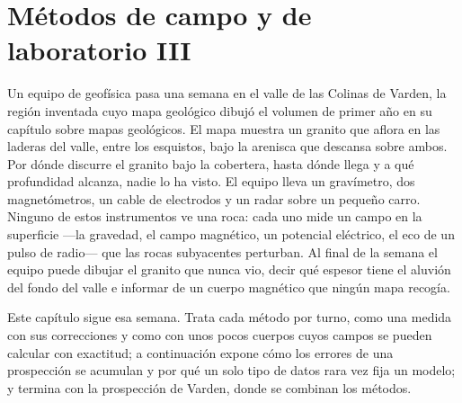 \chapter{Métodos de campo y de laboratorio III}\label{ch:b3:field-lab-methods-3}

Un equipo de geofísica pasa una semana en el valle de las Colinas de Varden, la
región inventada cuyo mapa geológico dibujó el volumen de primer año en su
capítulo sobre mapas geológicos. El mapa muestra un granito que aflora en
las laderas del valle, entre los esquistos, bajo la arenisca que descansa
sobre ambos. Por dónde discurre el granito bajo la cobertera, hasta dónde llega
y a qué profundidad alcanza, nadie lo ha visto. El equipo lleva un gravímetro,
dos magnetómetros, un cable de electrodos y un radar sobre un pequeño carro.
Ninguno de estos instrumentos ve una roca: cada uno mide un campo en la
superficie —la gravedad, el campo magnético, un potencial eléctrico, el eco de un pulso de radio—
que las rocas subyacentes perturban.
Al final de la semana el equipo puede dibujar el granito que nunca vio, decir
qué espesor tiene el aluvión del fondo del valle e informar de un cuerpo
magnético que ningún mapa recogía.

Este capítulo sigue esa semana. Trata cada método por turno, como una
medida con sus correcciones y como  con unos pocos cuerpos
cuyos campos se pueden calcular con exactitud; a continuación expone cómo
los errores de una prospección se acumulan y por qué un solo tipo de datos
rara vez fija un modelo; y termina con la prospección de Varden, donde
se combinan los métodos.

